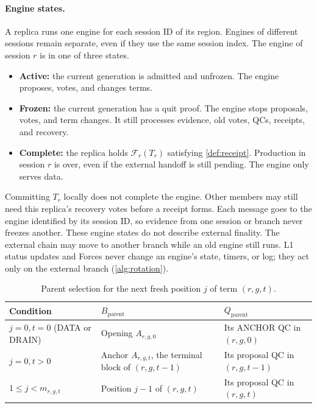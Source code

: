 \documentclass[11pt,a4paper]{article}
\newif\ifrevmarks
\newcommand{\Rv}[1]{\ifrevmarks\leavevmode{\color{rvBlue}#1}\else#1\fi}
\newcommand{\Cid}[1]{\ifrevmarks\textsuperscript{\hyperlink{chg:#1}{\color{rvBlue}\sffamily\scriptsize#1}}\fi}
\newcommand{\FC}{\mathcal F}
\begin{document}
\paragraph{Engine states.}
A replica runs one engine for each \Rv{session ID} of its region.
Engines \Rv{of different sessions} remain separate, even if they use the
same session index. The engine of
session $r$ is in one of three states.
\begin{itemize}
\item \textbf{Active:} the current generation is admitted and unfrozen.
The engine proposes, votes, and changes terms.
\item \textbf{Frozen:} the current generation has a quit proof. The
engine stops proposals, votes, and term changes. It still processes
evidence, old votes, QCs, receipts, and recovery.
\item \textbf{Complete:} the replica holds $\FC_r(T_r)$ satisfying
\cref{def:receipt}.
Production in session $r$ is over, even if the external handoff is still
pending. The engine only serves data.
\end{itemize}
Committing $T_r$ locally does not complete the engine. Other members may
still need this replica's recovery votes before a receipt forms. Each
message goes to the engine identified by its \Rv{session ID}, so
evidence from one session or branch never freezes another. These engine
states do not describe external finality. The external chain may move
to another branch while an old engine still runs. \Rv{L1 status
updates and Forces never change an engine's state, timers, or log; they
act only on the external branch (\cref{alg:rotation}).}

\begin{table}[htbp]\centering\small
\caption{Parent selection for the next fresh position $j$ of term $(r,g,t)$.}
\label{tab:parent}
\begin{tabularx}{\linewidth}{@{}l Y Y@{}}
\toprule
Condition & $B_{\mathrm{parent}}$ & $Q_{\mathrm{parent}}$\\
\midrule
$j=0,t=0$ (DATA or DRAIN) & Opening $A_{r,g,0}$ & Its ANCHOR QC in $(r,g,0)$\\
$j=0,t>0$ & Anchor $A_{r,g,t}$, the terminal block of $(r,g,t-1)$ & Its proposal QC in $(r,g,t-1)$\\
$1\le j<m_{r,g,t}$ & Position $j-1$ of $(r,g,t)$ & Its proposal QC in $(r,g,t)$\\
\bottomrule
\end{tabularx}
\end{table}
\end{document}
